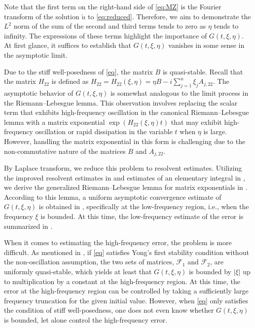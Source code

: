 \documentclass{article}
\theoremstyle{plain}%
\theoremstyle{definition}%
\theoremstyle{remark}%
\newcommand{\cF}{\mathcal{F}}
\newcommand{\+}[1]{{\bm{#1}}}
\begin{document}
Note that the first term on the right-hand side of \cref{eq:MZ} is 
the Fourier transform of the solution $\breve{u}$ to 
\cref{eq:reduced}.
Therefore, we aim to demonstrate the $L^2$ norm of the sum of the 
second and third terms tends to zero as $\eta$ tends to infinity.
The expressions of these terms highlight the importance of 
$G(t, \xi, \eta)$.
At first glance, it suffices to establish that $G(t, \xi, \eta)$ 
vanishes in some sense in the asymptotic limit.

Due to the stiff well-posedness of \cref{eq}, the matrix $B$ is 
quasi-stable.
Recall that the matrix $H_{22}$ is defined as $H_{22} = 
H_{22}(\xi, \eta) = \eta B - i \sum_{j = 1}^n \xi_j A_{j, 22}$.
The asymptotic behavior of $G(t, \xi, \eta)$ is somewhat analogous to 
the limit process in the Riemann--Lebesgue lemma. 
This observation involves replacing the scalar term that exhibits 
high-frequency 
oscillation in the canonical Riemann--Lebesgue lemma with a matrix 
exponential $\exp(H_{22}(\xi, \eta) t)$ that may exhibit 
high-frequency oscillation or rapid dissipation in the variable $t$ 
when $\eta$ is large.
However, handling the matrix exponential in this form is challenging 
due to the non-commutative nature of the matrices $B$ and $A_{j, 22}$.

By Laplace transform, we reduce this problem to resolvent estimates.
Utilizing the improved resolvent estimates in  and 
estimates of an elementary integral in , 
we derive the generalized Riemann--Lebesgue lemma for matrix 
exponentials in .
According to this lemma, a uniform asymptotic convergence estimate of 
$G(t, \xi, \eta)$ is obtained in ,
specifically at the low-frequency region, i.e.,
when the frequency $\xi$ is bounded.
At this time, the low-frequency estimate of the error is 
summarized in .

When it comes to estimating the high-frequency error, the 
problem is more difficult. 
As mentioned in , if \cref{eq} satisfies Yong's 
first stability condition without the non-oscillation assumption, the 
two sets of matrices, $\cF_1$ and $\cF_2$, are uniformly  
quasi-stable, which yields at least that $G(t, \xi, \eta)$ is 
bounded by $|\xi|$ up to multiplication by a constant at the 
high-frequency region. 
At this time, the error at the high-frequency region can be 
controlled by taking a sufficiently large frequency truncation for 
the given initial value. 
However, when \cref{eq} only satisfies the condition of stiff 
well-posedness, one does not even know whether $G(t, \xi, \eta)$ is 
bounded, let alone control the high-frequency error.
\end{document}
